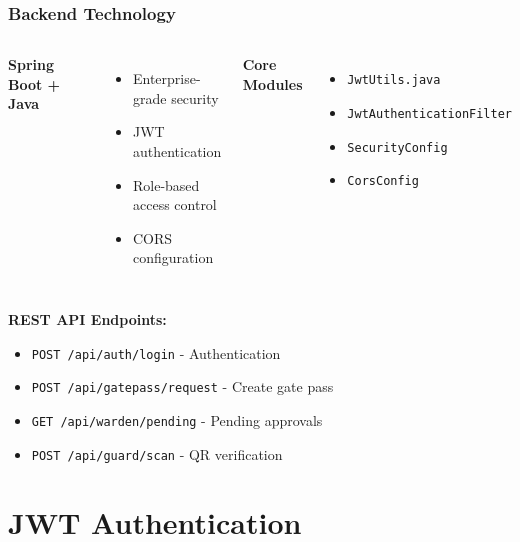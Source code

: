 \documentclass[11pt]{beamer}
\begin{document}
\begin{frame}
\frametitle{Backend Technology}
\begin{columns}[T]
\textbf{Spring Boot + Java}
\begin{itemize}
    \item Enterprise-grade security
    \item JWT authentication
    \item Role-based access control
    \item CORS configuration
\end{itemize}

\textbf{Core Modules}
\begin{itemize}
    \item \texttt{JwtUtils.java}
    \item \texttt{JwtAuthenticationFilter}
    \item \texttt{SecurityConfig}
    \item \texttt{CorsConfig}
\end{itemize}
\end{columns}

\vspace{1cm}
\textbf{REST API Endpoints:}
\begin{itemize}
    \item \texttt{POST /api/auth/login} - Authentication
    \item \texttt{POST /api/gatepass/request} - Create gate pass
    \item \texttt{GET /api/warden/pending} - Pending approvals
    \item \texttt{POST /api/guard/scan} - QR verification
\end{itemize}
\end{frame}

\section{JWT Authentication}
\end{document}
